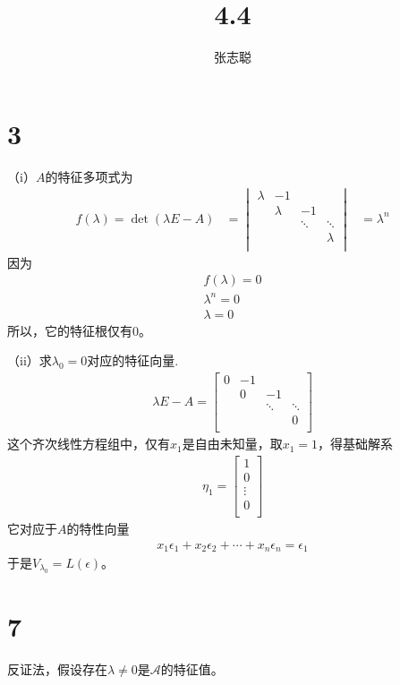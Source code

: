 \documentclass{article}
\begin{document}
\title{4.4}
\author{张志聪}
\maketitle

\section*{3}

（i）$A$的特征多项式为
\begin{align*}
  f(\lambda) = \det(\lambda E - A)
   & = \begin{vmatrix}
         \lambda & -1      &        &         \\
                 & \lambda & -1     &         \\
                 &         & \ddots & \ddots  \\
                 &         &        & \lambda \\
       \end{vmatrix}
   & = \lambda^n
\end{align*}
因为
\begin{align*}
  f(\lambda) = 0 \\
  \lambda^n = 0  \\
  \lambda = 0
\end{align*}
所以，它的特征根仅有0。

（ii）求$\lambda_0 = 0$对应的特征向量.
\begin{align*}
  \lambda E - A = \begin{bmatrix}
                    0 & -1 &        &        \\
                      & 0  & -1     &        \\
                      &    & \ddots & \ddots \\
                      &    &        & 0      \\
                  \end{bmatrix}
\end{align*}
这个齐次线性方程组中，仅有$x_1$是自由未知量，取$x_1 = 1$，得基础解系
\begin{align*}
  \eta_1 = \begin{bmatrix}
             1  \\
             0  \\
             \vdots  \\
             0  \\
           \end{bmatrix}
\end{align*}
它对应于$A$的特性向量
\begin{align*}
  x_1 \epsilon_1 + x_2 \epsilon_2 + \cdots + x_n \epsilon_n = \epsilon_1
\end{align*}
于是$V_{\lambda_0} = L(\epsilon)$。

\section*{7}

反证法，假设存在$\lambda \neq 0$是$\mathscr{A}$的特征值。
\end{document}
